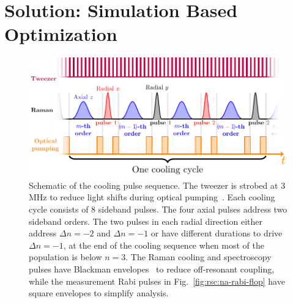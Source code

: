 \section{Solution: Simulation Based Optimization}
\label{ch:rsc:simulation}

\begin{figure}
  \centering
  \includegraphics[width=\textwidth]{figures/na_rsc_sequence.pdf}
  \caption[Simulation optimized Raman sideband cooling sequence for Sodium]{
    Schematic of the cooling pulse sequence. The tweezer is strobed at 3 MHz to
    reduce light shifts during optical pumping~\cite{hutzler_eliminating_2017}.
    Each cooling cycle consists of $8$ sideband pulses.
    The four axial pulses address two sideband orders.
    The two pulses in each radial direction either address $\Delta n=-2$ and $\Delta n=-1$
    or have different durations to drive $\Delta n=-1$,
    at the end of the cooling sequence when most of the population is below $n=3$.
    The Raman cooling and spectroscopy pulses have Blackman envelopes~\cite{kasevich_laser_1992}
    to reduce off-resonant coupling,
    while the measurement Rabi pulses in Fig.~\ref{fig:rsc:na-rabi-flop}
    have square envelopes to simplify analysis.
    \label{fig:rsc:na-sequence}}
\end{figure}

